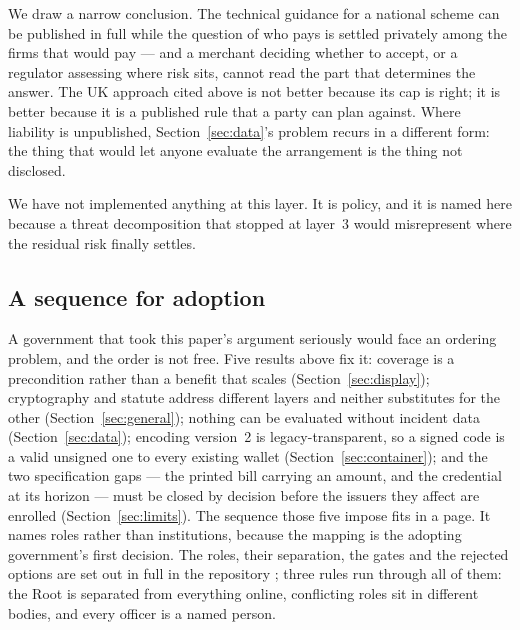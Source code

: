 \documentclass[10pt,a4paper,twocolumn]{article}
\begin{document}
We draw a narrow conclusion. The technical guidance for a national scheme can be
published in full while the question of who pays is settled privately among the
firms that would pay --- and a merchant deciding whether to accept, or a
regulator assessing where risk sits, cannot read the part that determines the
answer. The UK approach cited above is not better because its cap is
right; it is better because it is a published rule that a party can plan
against. Where liability is unpublished, Section~\ref{sec:data}'s problem
recurs in a different form: the thing that would let anyone evaluate the
arrangement is the thing not disclosed.

We have not implemented anything at this layer. It is policy, and it is named
here because a threat decomposition that stopped at layer~3 would misrepresent
where the residual risk finally settles.

\subsection{A sequence for adoption}
\label{sec:adoption}

A government that took this paper's argument seriously would face an ordering
problem, and the order is not free. Five results above fix it: coverage is a
precondition rather than a benefit that scales (Section~\ref{sec:display});
cryptography and statute address different layers and neither substitutes for
the other (Section~\ref{sec:general}); nothing can be evaluated without
incident data (Section~\ref{sec:data}); encoding version~2 is
legacy-transparent, so a signed code is a valid unsigned one to every existing
wallet (Section~\ref{sec:container}); and the two specification gaps --- the
printed bill carrying an amount, and the credential at its horizon --- must be
closed by decision before the issuers they affect are enrolled
(Section~\ref{sec:limits}). The sequence those five impose fits in a page. It
names roles rather than institutions, because the mapping is the adopting
government's first decision. The roles, their separation, the gates and the
rejected options are set out in full in the repository \citep{khsqr2026repo};
three rules run through all of them: the Root is separated from everything
online, conflicting roles sit in different bodies, and every officer is a named
person.
\end{document}
